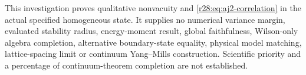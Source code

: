 This investigation proves qualitative nonvacuity and \eqref{r28:eq:aj2-correlation} in the actual specified homogeneous state. It supplies no numerical variance margin, evaluated stability radius, energy-moment result, global faithfulness, Wilson-only algebra completion, alternative boundary-state equality, physical model matching, lattice-spacing limit or continuum Yang--Mills construction. Scientific priority and a percentage of continuum-theorem completion are not established.

